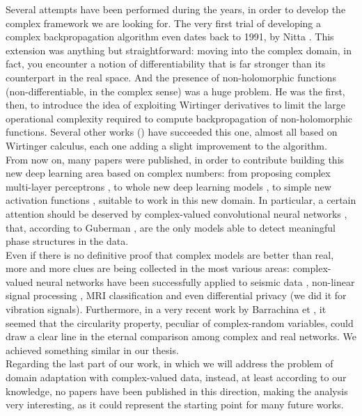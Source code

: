 \documentclass[../main.tex]{subfiles}
\begin{document}
Several attempts have been performed during the years, in order to develop the complex framework we are looking for. The very first trial of developing a complex backpropagation algorithm even dates back to 1991, by Nitta \cite{Nitta_complexBP}. This extension was anything but straightforward: moving into the complex domain, in fact, you encounter a notion of differentiability that is far stronger than its counterpart in the real space. And the presence of non-holomorphic functions (non-differentiable, in the complex sense) was a huge problem. He was the first, then, to introduce the idea of exploiting Wirtinger derivatives to limit the large operational complexity required to compute backpropagation of non-holomorphic functions. Several other works (\cite{kreutzdelgado2009complex, amin_wirtinger, Hualiang_nonlinear}) have succeeded this one, almost all based on Wirtinger calculus, each one adding a slight improvement to the algorithm.\\
From now on, many papers were published, in order to contribute building this new deep learning area based on complex numbers: from proposing complex multi-layer perceptrons \cite{complex_mlp}, to whole new deep learning models \cite{trabelsi2018deep}, to simple new activation functions \cite{scardapane2018complexvalued, virtue2017better}, suitable to work in this new domain. In particular, a certain attention should be deserved by complex-valued convolutional neural networks \cite{hirose_cvnn}, that, according to Guberman \cite{guberman2016complex}, are the only models able to detect meaningful phase structures in the data.\\
Even if there is no definitive proof that complex models are better than real, more and more clues are being collected in the most various areas: complex-valued neural networks have been successfully applied to seismic data \cite{Dramsch_seismic}, non-linear signal processing \cite{complex_mlp}, MRI classification \cite{virtue2017better} and even differential privacy \cite{ziller2021complexvalued} (we did it for vibration signals). Furthermore, in a very recent work by Barrachina et \cite{barrachina2021complexvalued}, it seemed that the circularity property, peculiar of complex-random variables, could draw a clear line in the eternal comparison among complex and real networks. We achieved something similar in our thesis.\\ Regarding the last part of our work, in which we will address the problem of domain adaptation with complex-valued data, instead, at least according to our knowledge, no papers have been published in this direction, making the analysis very interesting, as it could represent the starting point for many future works.
\end{document}
